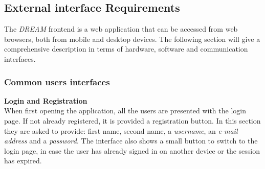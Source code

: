 \subsection{External interface Requirements}
The \emph{DREAM} frontend is a web application that can be accessed from web browsers, both from mobile and
desktop devices. The following section will give a comprehensive description in terms of hardware, software
and communication interfaces.

\bigskip
\subsubsection{Common users interfaces}
\textbf{Login and Registration}\\
When first opening the application, all the users are presented with the login page. If not already registered,
it is provided a registration button. In this section they are asked to provide: first name, second name,
a \emph{username}, an \emph{e-mail address} and a \emph{password}. The interface also shows a small button to switch
to the login page, in case the user has already signed in on another device or the session has expired.

